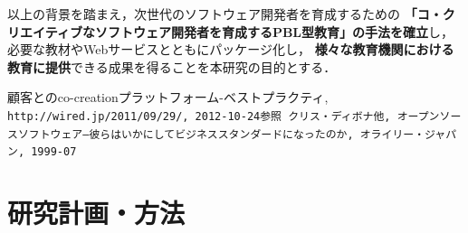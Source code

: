 \documentclass[11pt,a4paper,twoside]{jarticle}
\newcommand{\研究種別}{C}	%
\newcommand{\研究課題名}{コ・クリエイティブなソフトウェア開発者を育成するPBL型教育}
\newcommand{\研究機関名}{産業技術大学院大学}
\newcommand{\研究代表者氏名}{中鉢　欣秀}
\newcommand{\研究代表者氏名ふりがな}{ちゅうばち　よしひで}
\newcommand{\本応募effort}{\KLEffort{18}}	%
\newcommand{\研究期間の最終元号年度}{27}	%
\begin{document}
{    以上の背景を踏まえ，次世代のソフトウェア開発者を育成するための
    {\bf 「コ・クリエイティブなソフトウェア開発者を育成するPBL型教育」の手法を確立}し，必要な教材やWebサービスとともにパッケージ化し，
    {\bf 様々な教育機関における教育に提供}できる成果を得ることを本研究の目的とする．
    
	\vspace{1cm}
	\begin{thebibliography}{99}
		 顧客とのco-creationプラットフォーム-ベストプラクティ, \\
                        \tt{http://wired.jp/2011/09/29/},  2012-10-24参照
         クリス・ディボナ他, オープンソースソフトウェア―彼らはいかにしてビジネススタンダードになったのか,
        				オライリー・ジャパン, 1999-07
	\end{thebibliography}
}

\section{研究計画・方法}
\newcommand{\研究計画と方法概要}{%
	本研究では実施期間内においてアジャイル（迅速）に教材の開発と適用を繰り返し，より教育効果の高い
	PBL用電子教材を作成する．
	これには，迅速な電子教材開発のための「アジャイル教材製作スタジオ」を構築し，
	コンテンツとして用いる動画や音声を素早く製作できるように工夫する．
	製作した電子教材は，学生や教員がPBL実施時にオン・デマンドで参照できるようにし，
	学生の自発的な学びを支援する．

	初年度はScrum型の開発プロセスの教材を作成し，以降，コ・クリエイティブなソフトウェア開発のために
	必要な内容を拡充させる．成果物は本学および他大学でのPBLにおいて複数回利用し，改善を繰り返す．
	また，電子教材はクラウド型のサービスを用いて利用者に
	広く提供するものとする．
}
\end{document}
